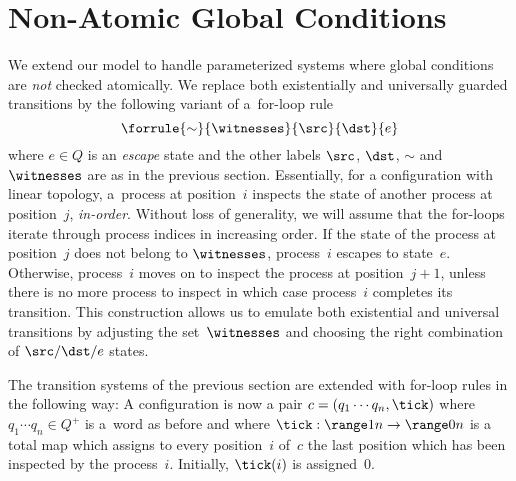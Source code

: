 \section{Non-Atomic Global Conditions}
\label{section:non:atomic:global:conditions}
\label{section:paramsys:non:atomic}
%
We extend our model to handle parameterized systems where global
conditions are \emph{not} checked atomically.
%
We replace both existentially and universally guarded transitions by
the following variant of a~for-loop rule%
$$
\forrule{\sim}{\witnesses}{\src}{\dst}{e}
$$
%
where $e\in Q$ is an \emph{escape} state and the other labels $\src$,
$\dst$, $\sim$ and $\witnesses$ are as in the previous section.
%
%
Essentially, for a configuration with linear topology, a~process at
position~$i$ inspects the state of another process at position~$j$,
\emph{in-order}.
%
Without loss of generality, we will assume that the for-loops iterate
through process indices in increasing order.
%
If the state of the process at position~$j$ does not belong to
$\witnesses$, process~$i$ escapes to state~$e$. Otherwise, process~$i$
moves on to inspect the process at position~$j+1$, unless there is no
more process to inspect in which case process~$i$ completes its
transition.
%
This construction allows us to emulate both existential and universal
transitions by adjusting the set~$\witnesses$ and choosing the right
combination of $\src/\dst/e$ states.
%

%
The transition systems of the previous
section %
are extended with for-loop rules in the following way: %
%
A configuration is now a pair $c = (q_1\cdots q_n,\tick)$ where
$q_1\cdots q_n\in Q^+$ is a~word as before and where $\tick:\range 1 n
\rightarrow \range 0 n$ is a total map which assigns to every
position~$i$ of~$c$ the last position which has been inspected by the
process~$i$.
%
Initially, $\tick(i)$ is assigned~$0$.


